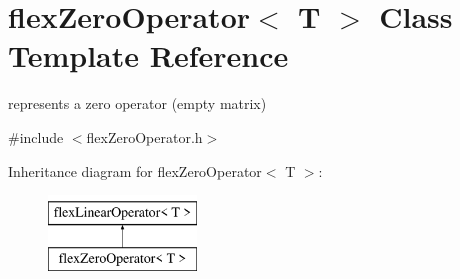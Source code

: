 \hypertarget{classflex_zero_operator}{}\section{flex\+Zero\+Operator$<$ T $>$ Class Template Reference}
\label{classflex_zero_operator}


represents a zero operator (empty matrix)  




{\ttfamily \#include $<$flex\+Zero\+Operator.\+h$>$}

Inheritance diagram for flex\+Zero\+Operator$<$ T $>$\+:\begin{figure}[H]
\begin{center}
\leavevmode
\includegraphics[height=2.000000cm]{classflex_zero_operator}
\end{center}
\end{figure}
